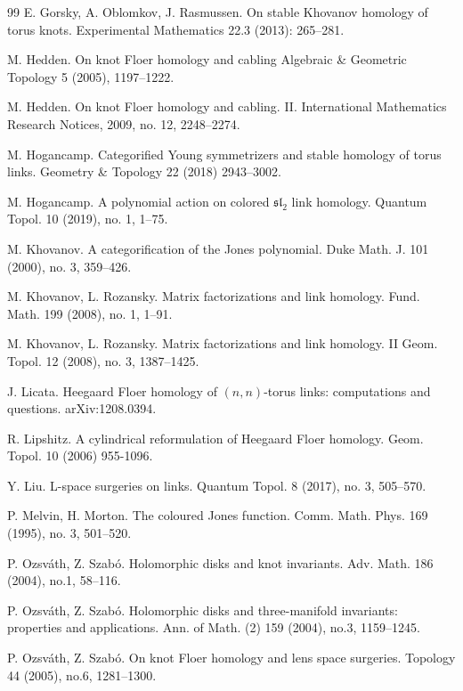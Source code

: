 \documentclass{amsart}
\begin{document}
\begin{thebibliography}{99}
 E. Gorsky, A. Oblomkov, J. Rasmussen. On stable Khovanov homology of torus knots. Experimental Mathematics 22.3 (2013): 265--281.

 M. Hedden. On knot Floer homology and cabling
Algebraic \& Geometric Topology 5 (2005), 1197--1222.

  M. Hedden. On knot Floer homology and cabling. II.
International Mathematics Research Notices, 2009, no. 12, 2248--2274.

M. Hogancamp. Categorified Young symmetrizers and stable homology of torus links.
Geometry \& Topology 22 (2018) 2943--3002.

 M. Hogancamp. A polynomial action on colored  $\mathfrak{sl}_2$  link homology.
Quantum Topol. 10 (2019), no. 1, 1--75.


  M. Khovanov. A categorification of the Jones polynomial.
Duke Math. J. 101 (2000), no. 3, 359--426.

 M. Khovanov, L. Rozansky. Matrix factorizations and link homology.
Fund. Math. 199 (2008), no. 1, 1--91.

  M. Khovanov, L. Rozansky. Matrix factorizations and link homology. II
Geom. Topol. 12 (2008), no. 3, 1387--1425.


 J. Licata. Heegaard Floer homology of $(n,n)$-torus links: computations and questions.  arXiv:1208.0394.

 R. Lipshitz. A cylindrical reformulation of Heegaard Floer homology. Geom. Topol. 10 (2006) 955-1096.

 Y. Liu. L-space surgeries on links. Quantum Topol. 8 (2017), no. 3, 505--570.

 P. Melvin, H. Morton. The coloured Jones function. Comm. Math. Phys. 169 (1995), no. 3, 501--520.



 P. Ozsv\'ath, Z. Szab\'o. Holomorphic disks and knot invariants. Adv. Math. 186 (2004), no.1, 58--116. 



 P. Ozsv\'ath, Z. Szab\'o. Holomorphic disks and three-manifold invariants: properties  and applications. Ann. of Math. (2) 159 (2004), no.3, 1159--1245. 

 P. Ozsv\'ath, Z. Szab\'o. On knot Floer homology and lens space surgeries. Topology 44 (2005), no.6, 1281--1300.



\end{thebibliography}
\end{document}
